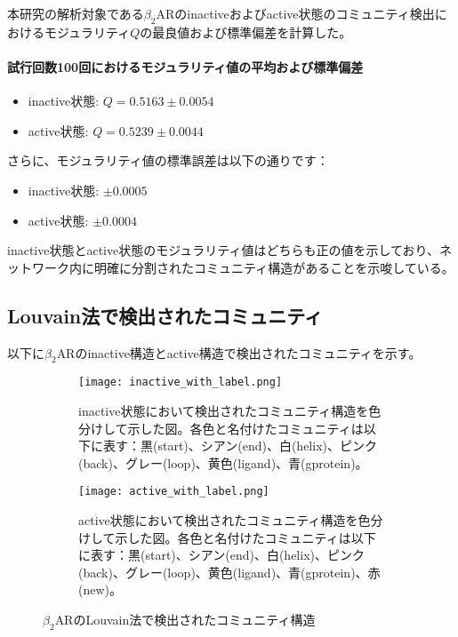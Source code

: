 本研究の解析対象である$\beta_2$ARのinactiveおよびactive状態のコミュニティ検出におけるモジュラリティ$Q$の最良値および標準偏差を計算した。

\paragraph{試行回数100回におけるモジュラリティ値の平均および標準偏差}
\begin{itemize}
    \item inactive状態: \( Q = 0.5163 \pm 0.0054 \)
    \item active状態: \( Q = 0.5239 \pm 0.0044 \)
\end{itemize}
さらに、モジュラリティ値の標準誤差は以下の通りです：
\begin{itemize}
    \item inactive状態: \( \pm 0.0005 \)
    \item active状態: \( \pm 0.0004 \)
\end{itemize}

inactive状態とactive状態のモジュラリティ値はどちらも正の値を示しており、ネットワーク内に明確に分割されたコミュニティ構造があることを示唆している。

\subsection{Louvain法で検出されたコミュニティ}

以下に$\beta_2$ARのinactive構造とactive構造で検出されたコミュニティを示す。

\begin{figure}[htbp]
    \centering
    \begin{subfigure}{0.60\textwidth} %
      \centering
      \texttt{[image: inactive\_with\_label.png]}
      \caption{inactive状態において検出されたコミュニティ構造を色分けして示した図。各色と名付けたコミュニティは以下に表す：黒(start)、シアン(end)、白(helix)、ピンク(back)、グレー(loop)、黄色(ligand)、青(gprotein)。}
      \label{fig:inactive_community}
    \end{subfigure}
    \hspace{0.02\textwidth} %
    \begin{subfigure}{0.60\textwidth}
      \centering
      \texttt{[image: active\_with\_label.png]}
      \caption{active状態において検出されたコミュニティ構造を色分けして示した図。各色と名付けたコミュニティは以下に表す：黒(start)、シアン(end)、白(helix)、ピンク(back)、グレー(loop)、黄色(ligand)、青(gprotein)、赤(new)。}
      \label{fig:active_community}
    \end{subfigure}
    \caption{$\beta_2$ARのLouvain法で検出されたコミュニティ構造}
    \label{fig:community-all}
  \end{figure}

